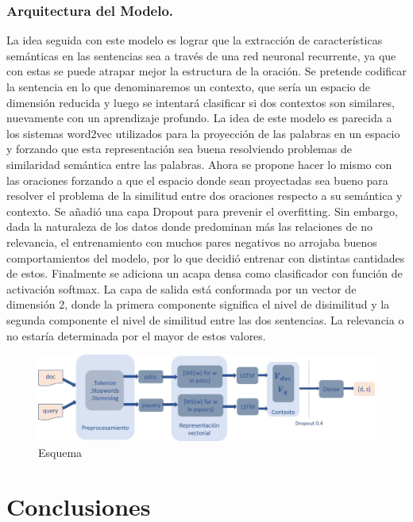 \documentclass{llncs}
\begin{document}
\subsubsection{Arquitectura del Modelo.}
La idea seguida con este modelo es lograr que la extracción de características semánticas en las sentencias sea a través de una red neuronal recurrente, ya que con estas se puede atrapar mejor la estructura de la oración. Se pretende codificar la sentencia en lo que denominaremos un contexto, que sería un espacio de dimensión reducida y luego se intentará clasificar si dos contextos son similares, nuevamente con un aprendizaje profundo.
La idea de este modelo es parecida a los sistemas word2vec utilizados para la proyección de las palabras en un espacio y forzando que esta representación sea buena resolviendo problemas de similaridad semántica entre las palabras. Ahora se propone hacer lo mismo con las oraciones forzando a que el espacio donde sean proyectadas sea bueno para resolver el problema de la similitud entre dos oraciones respecto a su semántica y contexto. 
Se añadió una capa Dropout para prevenir el overfitting. Sin embargo, dada la naturaleza de los datos donde predominan más las relaciones de no relevancia, el entrenamiento con muchos pares negativos no arrojaba buenos comportamientos del modelo, por lo que decidió entrenar con distintas cantidades de estos. Finalmente se adiciona un acapa densa como clasificador con función de activación softmax. La capa de salida está conformada por un vector de dimensión 2, donde la primera componente significa el nivel de disimilitud y la segunda componente el nivel de similitud entre las dos sentencias. La relevancia o no estaría determinada por el mayor de estos valores.

\begin{figure}
	\begin{center}
		\includegraphics[width=\linewidth]{ ./images/lstm.jpg}
		\caption{Esquema}
		\label{lstm}
	\end{center}
\end{figure}


\section{Conclusiones}
     
\end{document}
